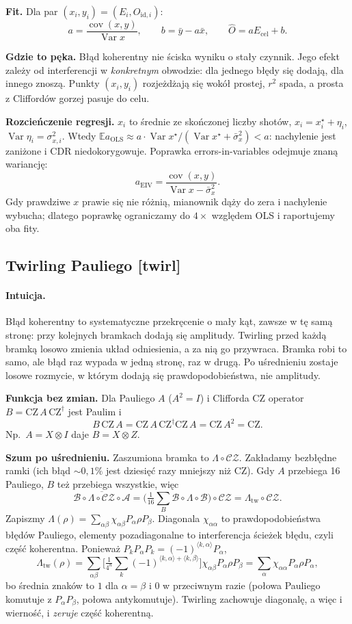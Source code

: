 \documentclass[11pt,a4paper]{article}
\newcommand{\slid}[1]{\hfill{\normalfont\small\ttfamily\color{axbluedk}[#1]}}
\newcommand{\Var}{\operatorname{Var}}
\newcommand{\Cov}{\operatorname{cov}}
\newcommand{\E}{\mathbb{E}}
\newcommand{\CZ}{\mathrm{CZ}}
\newcommand{\intu}{\paragraph{Intuicja.}}
\begin{document}
\textbf{Fit.} Dla par $(x_i,y_i)=(E_i,O_{\mathrm{id},i})$:
\[
  a=\frac{\Cov(x,y)}{\Var x},\qquad b=\bar y-a\bar x,\qquad\hat O=aE_{\text{cel}}+b .
\]

\textbf{Gdzie to pęka.} Błąd koherentny nie ściska wyniku o stały czynnik. Jego efekt zależy od
interferencji w \emph{konkretnym} obwodzie: dla jednego błędy się dodają, dla innego znoszą.
Punkty $(x_i,y_i)$ rozjeżdżają się wokół prostej, $r^2$ spada, a prosta z Cliffordów gorzej
pasuje do celu.

\textbf{Rozcieńczenie regresji.} $x_i$ to średnie ze skończonej liczby shotów,
$x_i=x_i^\star+\eta_i$, $\Var\eta_i=\sigma_{x,i}^2$. Wtedy
$\E a_{\text{OLS}}\approx a\cdot\Var x^\star/(\Var x^\star+\bar\sigma_x^2)<a$: nachylenie jest
zaniżone i CDR niedokorygowuje. Poprawka errors-in-variables odejmuje znaną wariancję:
\[
  a_{\text{EIV}}=\frac{\Cov(x,y)}{\Var x-\bar\sigma_x^2}.
\]
Gdy prawdziwe $x$ prawie się nie różnią, mianownik dąży do zera i nachylenie wybucha; dlatego
poprawkę ograniczamy do $4\times$ względem OLS i raportujemy oba fity.

\subsection{Twirling Pauliego \slid{twirl}}

\intu Błąd koherentny to systematyczne przekręcenie o mały kąt, zawsze w tę samą stronę: przy
kolejnych bramkach dodają się amplitudy. Twirling przed każdą bramką losowo zmienia układ
odniesienia, a za nią go przywraca. Bramka robi to samo, ale błąd raz wypada w jedną stronę, raz
w drugą. Po uśrednieniu zostaje losowe rozmycie, w którym dodają się prawdopodobieństwa, nie
amplitudy.

\textbf{Funkcja bez zmian.} Dla Pauliego $A$ ($A^2=I$) i Clifforda CZ operator
$B=\CZ\,A\,\CZ^\dagger$ jest Paulim i
\[
  B\,\CZ\,A=\CZ\,A\,\CZ^\dagger\CZ\,A=\CZ\,A^2=\CZ .
\]
Np.\ $A=X\otimes I$ daje $B=X\otimes Z$.

\textbf{Szum po uśrednieniu.} Zaszumiona bramka to $\Lambda\circ\mathcal{CZ}$. Zakładamy bezbłędne
ramki (ich błąd $\sim0{,}1\%$ jest dziesięć razy mniejszy niż CZ). Gdy $A$ przebiega 16
Pauliego, $B$ też przebiega wszystkie, więc
\[
  \overline{\mathcal B\circ\Lambda\circ\mathcal{CZ}\circ\mathcal A}
  =\Big(\tfrac1{16}\textstyle\sum_B\mathcal B\circ\Lambda\circ\mathcal B\Big)\circ\mathcal{CZ}
  =\Lambda_{\text{tw}}\circ\mathcal{CZ}.
\]
Zapiszmy $\Lambda(\rho)=\sum_{\alpha\beta}\chi_{\alpha\beta}P_\alpha\rho P_\beta$. Diagonala
$\chi_{\alpha\alpha}$ to prawdopodobieństwa błędów Pauliego, elementy pozadiagonalne to
interferencja ścieżek błędu, czyli część koherentna. Ponieważ
$P_kP_\alpha P_k=(-1)^{\langle k,\alpha\rangle}P_\alpha$,
\[
  \Lambda_{\text{tw}}(\rho)=\sum_{\alpha\beta}\Big[\tfrac1{4^n}\textstyle\sum_k(-1)^{\langle k,\alpha\rangle+\langle k,\beta\rangle}\Big]\chi_{\alpha\beta}P_\alpha\rho P_\beta=\sum_\alpha\chi_{\alpha\alpha}P_\alpha\rho P_\alpha ,
\]
bo średnia znaków to $1$ dla $\alpha=\beta$ i $0$ w przeciwnym razie (połowa Pauliego komutuje z
$P_\alpha P_\beta$, połowa antykomutuje). Twirling zachowuje diagonalę, a więc i wierność, i
\emph{zeruje} część koherentną.
\end{document}

